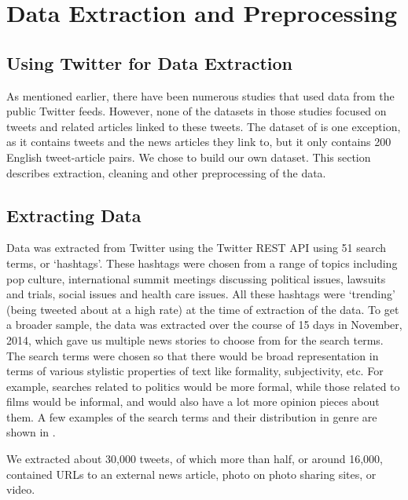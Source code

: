 \section{Data Extraction and Preprocessing}

\subsection{Using Twitter for Data Extraction}

As mentioned earlier, there have been numerous studies that used data from the public Twitter feeds. However, none of the datasets in those studies focused on tweets and related articles linked to these tweets. The dataset of  is one exception, as it contains tweets and the news articles they link to, but it only contains 200 English tweet-article pairs. We chose to build our own dataset. This section describes extraction, cleaning and other preprocessing of the data.

\subsection{Extracting Data}

Data was extracted from Twitter using the Twitter REST API using 51 search terms, or ‘hashtags’. These hashtags were chosen from a range of topics including pop culture,  international summit meetings discussing political issues, lawsuits and trials, social issues and health care issues. All these hashtags were ‘trending’ (being tweeted about at a high rate) at the time of extraction of the data. To get a broader sample, the data was extracted over the course of 15 days in November, 2014, which gave us multiple news stories to choose from for the search terms. The search terms were chosen so that there would be broad representation in terms of various stylistic properties of text like formality, subjectivity, etc. For example, searches related to politics would be more formal, while those related to films would be informal, and would also have a lot more opinion pieces about them. A few examples of the search terms and their distribution in genre are shown in .

We extracted about 30,000 tweets, of which more than half, or around 16,000, contained URLs to an external news article, photo on photo sharing sites, or video. %

